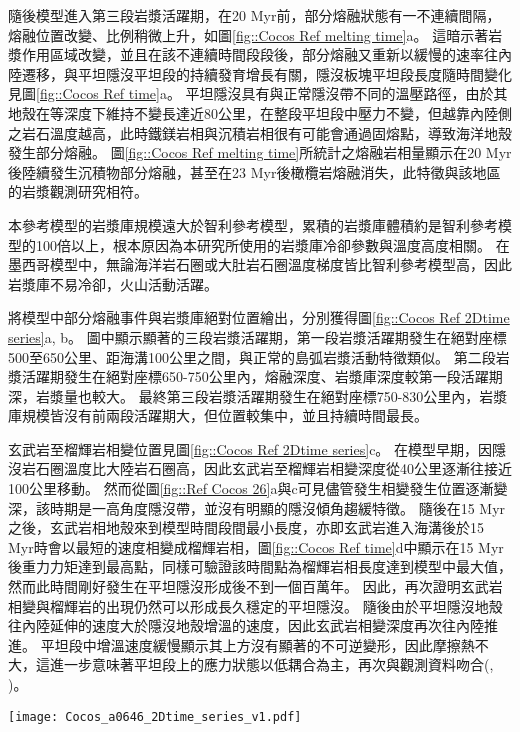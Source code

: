 隨後模型進入第三段岩漿活躍期，在20 Myr前，部分熔融狀態有一不連續間隔，熔融位置改變、比例稍微上升，如圖\ref{fig::Cocos Ref melting time}a。
這暗示著岩漿作用區域改變，並且在該不連續時間段段後，部分熔融又重新以緩慢的速率往內陸遷移，與平坦隱沒平坦段的持續發育增長有關，隱沒板塊平坦段長度隨時間變化見圖\ref{fig::Cocos Ref time}a。
平坦隱沒具有與正常隱沒帶不同的溫壓路徑，由於其地殼在等深度下維持不變長達近80公里，在整段平坦段中壓力不變，但越靠內陸側之岩石溫度越高，此時鐵鎂岩相與沉積岩相很有可能會通過固熔點，導致海洋地殼發生部分熔融。
圖\ref{fig::Cocos Ref melting time}所統計之熔融岩相量顯示在20 Myr後陸續發生沉積物部分熔融，甚至在23 Myr後橄欖岩熔融消失，此特徵與該地區的岩漿觀測研究相符。

本參考模型的岩漿庫規模遠大於智利參考模型，累積的岩漿庫體積約是智利參考模型的100倍以上，根本原因為本研究所使用的岩漿庫冷卻參數與溫度高度相關。
在墨西哥模型中，無論海洋岩石圈或大肚岩石圈溫度梯度皆比智利參考模型高，因此岩漿庫不易冷卻，火山活動活躍。

將模型中部分熔融事件與岩漿庫絕對位置繪出，分別獲得圖\ref{fig::Cocos Ref 2Dtime series}a, b。
圖中顯示顯著的三段岩漿活躍期，第一段岩漿活躍期發生在絕對座標500至650公里、距海溝100公里之間，與正常的島弧岩漿活動特徵類似。
第二段岩漿活躍期發生在絕對座標650-750公里內，熔融深度、岩漿庫深度較第一段活躍期深，岩漿量也較大。
最終第三段岩漿活躍期發生在絕對座標750-830公里內，岩漿庫規模皆沒有前兩段活躍期大，但位置較集中，並且持續時間最長。

玄武岩至榴輝岩相變位置見圖\ref{fig::Cocos Ref 2Dtime series}c。
在模型早期，因隱沒岩石圈溫度比大陸岩石圈高，因此玄武岩至榴輝岩相變深度從40公里逐漸往接近100公里移動。
然而從圖\ref{fig::Ref Cocos 26}a與c可見儘管發生相變發生位置逐漸變深，該時期是一高角度隱沒帶，並沒有明顯的隱沒傾角趨緩特徵。
隨後在15 Myr之後，玄武岩相地殼來到模型時間段間最小長度，亦即玄武岩進入海溝後於15 Myr時會以最短的速度相變成榴輝岩相，圖\ref{fig::Cocos Ref time}d中顯示在15 Myr後重力力矩達到最高點，同樣可驗證該時間點為榴輝岩相長度達到模型中最大值，然而此時間剛好發生在平坦隱沒形成後不到一個百萬年。
因此，再次證明玄武岩相變與榴輝岩的出現仍然可以形成長久穩定的平坦隱沒。
隨後由於平坦隱沒地殼往內陸延伸的速度大於隱沒地殼增溫的速度，因此玄武岩相變深度再次往內陸推進。
平坦段中增溫速度緩慢顯示其上方沒有顯著的不可逆變形，因此摩擦熱不大，這進一步意味著平坦段上的應力狀態以低耦合為主，再次與觀測資料吻合(\citealp{moran2007cenozoic}, \citealp{PerezCampos2008})。

\begin{figure*}[ht]
    \centering
    \texttt{[image: Cocos\_a0646\_2Dtime\_series\_v1.pdf]}
    \caption[墨西哥參考模型部分熔融、岩漿庫與玄武岩相變時空關係圖]{墨西哥參考模型部分熔融、岩漿庫與玄武岩相變時空關係圖。}
    \label{fig::Cocos Ref 2Dtime series}
\end{figure*}


